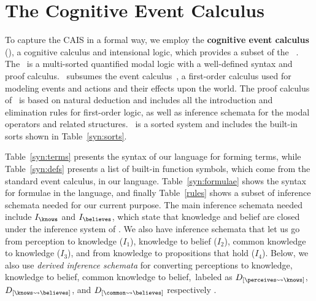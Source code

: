 \section{The Cognitive Event Calculus}


To capture the CAIS in a formal way, we employ the
\textbf{cognitive event calculus} (\CEC), a cognitive calculus and
intensional logic, which provides a subset of the \DCEC~\cite{nsg_sb_dde_ijcai}.
The \CEC\ is a multi-sorted
quantified modal logic with a well-defined syntax and proof calculus.
\CEC\ subsumes the event calculus~\cite{mueller_commonsense_2014}, a first-order
calculus used for modeling events and actions and their effects upon
the world.  The proof calculus of \CEC\ is based on natural deduction
\cite{gentzen_investigations_1964} and includes all the introduction and elimination
rules for first-order logic, as well as inference schemata for the
modal operators and related structures.  \CEC\ is a sorted system and
includes the built-in sorts shown in Table~\ref{syn:sorts}.

Table~\ref{syn:terms} presents the syntax of our language for forming
terms, while Table~\ref{syn:defs} presents a list of built-in function
symbols, which come from the standard event calculus, in our language.
Table~\ref{syn:formulae} shows the syntax for
formulae in the language, and finally Table~\ref{rules} shows a subset of
inference schemata needed for our current purpose. The main
inference schemata needed include $I_{\knows}$ and $I_{\believes}$,
which state that knowledge and belief are closed under the inference
system of \CEC.  We also have inference schemata that let us go
from perception to knowledge ($I_1$), knowledge to belief ($I_2$),
common knowledge to knowledge ($I_3$), and from knowledge to
propositions that hold ($I_4$). Below, we also use \emph{derived
  inference schemata} for converting perceptions to knowledge,
knowledge to belief, common knowledge to belief,~labeled as
$D_{[\perceives \leadsto \knows]}$, $D_{[\knows \leadsto \believes]}$,
and $D_{[\common \leadsto \believes]}$ respectively
\cite{ArkoudasAndBringsjord2008Pricai}.

